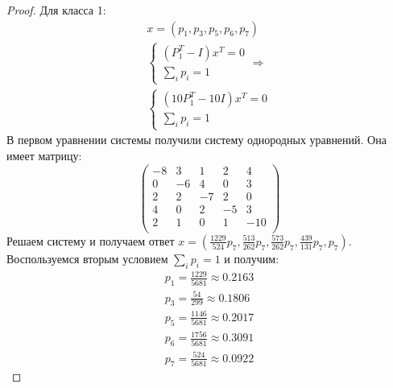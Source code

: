 \begin{proof}
Для класса 1:
\begin{gather*}
    x = (p_1, p_3, p_5, p_6, p_7)\\
    \begin{cases}
        (P_1^T - I)x^T = 0 \\
        \sum_i p_i = 1
    \end{cases} \Rightarrow \\
    \begin{cases}
        (10P_1^T - 10I)x^T = 0 \\
        \sum_i p_i = 1
    \end{cases}
\end{gather*}
В первом уравнении системы получили систему однородных уравнений. Она имеет матрицу:
\[
\begin{pmatrix}
    -8 & 3 & 1 & 2 & 4 \\
    0 & -6 & 4 & 0 & 3 \\
    2 & 2 & -7 & 2 & 0 \\
    4 & 0 & 2 & -5 & 3 \\
    2 & 1 & 0 & 1 & -10 \\
\end{pmatrix}
\]
Решаем систему и получаем ответ $x = (\frac{1229}{524}p_7, \frac{513}{262}p_7, \frac{573}{262}p_7, \frac{439}{131}p_7, p_7)$. Воспользуемся вторым условием $\sum_i p_i = 1$ и получим:\\
\begin{gather*}
    p_1 = \frac{1229}{5681}\approx 0.2163\\
    p_3 = \frac{54}{299}\approx 0.1806\\
    p_5 = \frac{1146}{5681}\approx 0.2017\\
    p_6 = \frac{1756}{5681}\approx 0.3091\\
    p_7 = \frac{524}{5681}\approx 0.0922
\end{gather*}


\end{proof}
